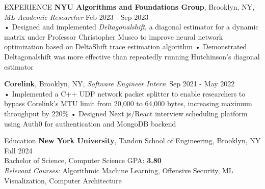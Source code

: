 \documentclass{resume} %
\begin{document}
\begin{rSection}{EXPERIENCE}
\textbf {NYU Algorithms and Foundations Group}, Brooklyn, NY, {\emph{ML Academic Researcher}} \hfill Feb 2023 - Sep 2023 \\
• Designed and implemented \textit{Deltagonalshift}, a diagonal estimator for a dynamic matrix under Professor Christopher Musco to improve neural network optimization based on DeltaShift trace estimation algorithm \newline
• Demonstrated Deltagonalshift was more effective than repeatedly running Hutchinson's diagonal estimator \smallskip

\textbf{Corelink}, Brooklyn, NY, {\emph{Software Engineer Intern}}\ \hfill Sep 2021 - May 2022 \\
• Implemented a C++ UDP network packet splitter to enable researchers to bypass Corelink's MTU limit from 20,000 to 64,000 bytes, increasing maximum throughput by 220\% \newline
• Designed Next.js/React interview scheduling platform using Auth0 for authentication and MongoDB backend

\end{rSection}



\begin{rSection}{Education}
    \textbf{New York University}, Tandon School of Engineering, Brooklyn, NY \hfill {Fall 2024}\\
    Bachelor of Science, Computer Science \hfill GPA: \textbf {3.80} \\
    {\emph {Relevant Courses:}} {Algorithmic Machine Learning, Offensive Security, ML Visualization, Computer Architecture}
\end{rSection}


\end{document}
